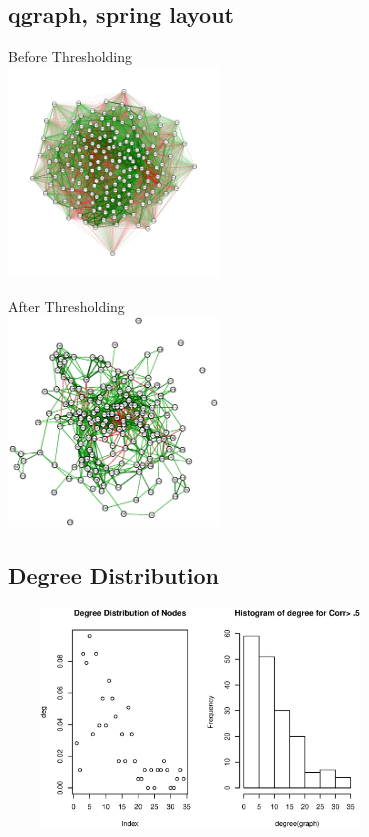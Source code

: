 \documentclass[bigger]{beamer}
\begin{document}
\subsection{qgraph, spring layout}
\label{sec-2-3}
\begin{frame}
\begin{multicols}{2}
\begin{center}
	Before Thresholding\\
	\includegraphics[height=2.2in,width=2.2in]{qgraph.png}
\end{center}
\begin{center}
	After Thresholding\\
	\includegraphics[height=2.2in,width=2.2in]{qplotpt5.eps}
\end{center}
\end{multicols}
\end{frame}

\subsection{Degree Distribution}
\label{sec-2-4}
\begin{frame}
\begin{center}
	\includegraphics[width=4in,height=2.3in]{distpt5.eps}
\end{center}
\end{frame}
\end{document}
